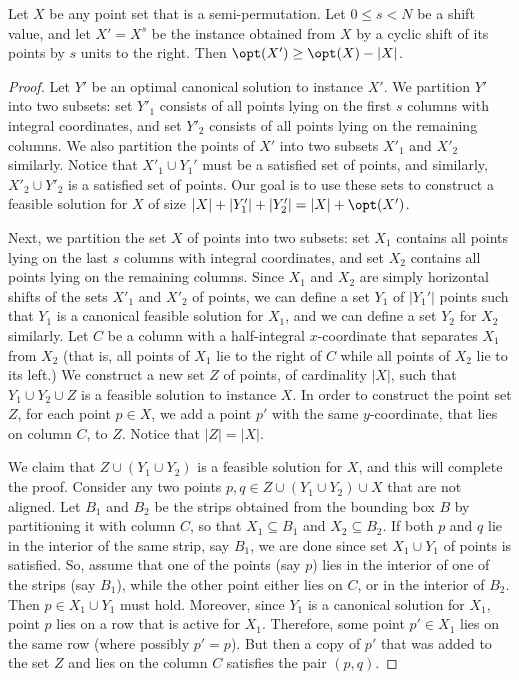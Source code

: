 \documentclass{toc}
\begin{document}
\begin{claim}\label{claim: shifting does not hurt opt}
Let $X$ be any point set that is a semi-permutation. Let $0\leq s<N$ be a shift value, and let $X'=X^s$ be the instance obtained from $X$ by a cyclic shift of its points by $s$ units to the right. 
Then $\opt(X')\geq \opt(X)-|X|$.
\end{claim}
\begin{proof}

Let $Y'$ be an optimal canonical solution to instance $X'$. 
We partition $Y'$ into two subsets: set $Y'_1$ consists of all points lying on the first $s$ columns with integral coordinates, and set $Y'_2$ consists of all points lying on the remaining columns. 
We also partition the points of $X'$ into two subsets $X'_1$ and $X'_2$ similarly.  Notice that $X'_1\cup Y_1'$ must be a satisfied set of points, and similarly, $X'_2\cup Y'_2$ is a satisfied set of points.
Our goal is to use these sets to construct a feasible solution for $X$ of size $|X|+|Y'_1| + |Y'_2| = |X|+\opt(X')$.
	
Next, we partition the set $X$ of points into two subsets: set $X_1$ contains all points lying on the last $s$ columns with integral coordinates, and set $X_2$ contains all points lying on the remaining columns. 
Since $X_1$ and $X_2$ are simply horizontal shifts of the sets $X'_1$ and $X'_2$ of points, we can define a set $Y_1$ of $|Y_1'|$ points such that $Y_1$ is a canonical feasible solution for $X_1$, and we can define a set $Y_2$ for $X_2$ similarly. 
%
Let $C$ be a column with a half-integral $x$-coordinate that separates $X_1$ from $X_2$ (that is, all points of $X_1$ lie to the right of $C$ while all points of $X_2$ lie to its left.) We construct a new set $Z$ of points, of cardinality $|X|$, such that $Y_1\cup Y_2\cup Z$ is a feasible solution to instance $X$. In order to construct the point set $Z$,
for each point $p \in X$, we add a point $p'$ with the same $y$-coordinate, that lies on column $C$, to $Z$. Notice that $|Z|=|X|$.

 
We claim that $Z \cup (Y_1 \cup Y_2)$ is a feasible solution  for $X$, and this will complete the proof.  
Consider any two points $p,q \in Z \cup (Y_1 \cup Y_2) \cup X$ that are not aligned.
Let $B_1$ and $B_2$ be the strips obtained from the bounding box $B$ by partitioning it with column $C$, so that $X_1\subseteq B_1$ and $X_2\subseteq B_2$. 
If both $p$ and $q$ lie in the interior of the same strip, say $B_1$, we are done since set $X_1\cup Y_1$ of points is satisfied.
So, assume that  one of the points (say $p$) lies in the interior of one of the strips (say $B_1$), while the other point either lies on $C$, or in the interior of $B_2$. Then $p\in X_1\cup Y_1$ must hold. Moreover, since $Y_1$ is a canonical solution for $X_1$, point $p$ lies on a row that is active for $X_1$. Therefore, some point $p'\in X_1$ lies on the same row (where possibly $p'=p$). But then a copy of $p'$ that was added to the set $Z$ and lies on the column $C$ satisfies the pair $(p,q)$.     
\end{proof}
\end{document}
